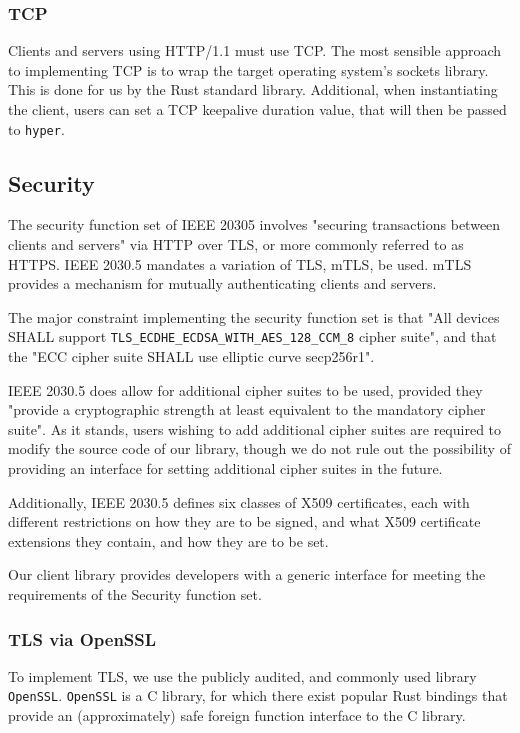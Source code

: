 \subsubsection{TCP}
Clients and servers using HTTP/1.1 must use TCP. The most sensible approach to implementing TCP is to wrap the target operating system's sockets library. This is done for us by the Rust standard library.
Additional, when instantiating the client, users can set a TCP keepalive duration value, that will then be passed to \texttt{hyper}.

\subsection{Security}
The security function set of IEEE 20305 involves "securing transactions between clients and servers" via HTTP over TLS, or more commonly referred to as HTTPS. IEEE 2030.5 mandates a variation of TLS, mTLS, be used. mTLS provides a mechanism for mutually authenticating clients and servers. 

The major constraint implementing the security function set is that "All devices SHALL support \texttt{TLS\_ECDHE\_ECDSA\_WITH\_AES\_128\_CCM\_8} cipher suite", and that the "ECC cipher suite SHALL use elliptic curve secp256r1".\cite{IEEE2030.5}

IEEE 2030.5 does allow for additional cipher suites to be used, provided they "provide a cryptographic strength at least equivalent to the mandatory cipher suite". \cite{IEEE2030.5} As it stands, users wishing to add additional cipher suites are required to modify the source code of our library, though we do not rule out the possibility of providing an interface for setting additional cipher suites in the future.

Additionally, IEEE 2030.5 defines six classes of X509 certificates, each with different restrictions on how they are to be signed, and what  X509 certificate extensions they contain, and how they are to be set.

Our client library provides developers with a generic interface for meeting the requirements of the Security function set.

\subsubsection{TLS via OpenSSL}
To implement TLS, we use the publicly audited, and commonly used library \texttt{OpenSSL}. \texttt{OpenSSL} is a C library, for which there exist popular Rust bindings that provide an (approximately) safe foreign function interface to the C library. \cite{openssl}

